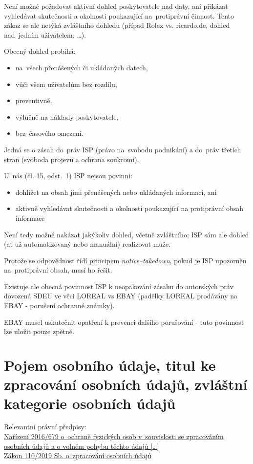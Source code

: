 Není možné požadovat aktivní dohled poskytovatele nad daty, ani přikázat vyhledávat skutečnosti a okolnosti poukazující na~protiprávní činnost.
Tento zákaz se ale netýká zvláštního dohledu (případ Rolex vs. ricardo.de, dohled nad~jedním uživatelem, \dots).

Obecný dohled probíhá:
\begin{itemize}
    \item na~všech přenášených či ukládaných datech,
    \item vůči všem uživatelům bez rozdílu,
    \item preventivně,
    \item výlučně na náklady poskytovatele,
    \item bez~časového omezení.
\end{itemize}
Jedná se o zásah do~práv ISP (právo na~svobodu podnikání) a do~práv třetích stran (svoboda projevu a ochrana soukromí).

U~nás (čl. 15, odst.~1) ISP nejsou povinni:
\begin{itemize}
    \item dohlížet na obsah jimi přenášených nebo ukládaných informaci, ani
    \item aktivně vyhledávat skutečnosti a okolnosti poukazující na protiprávní obsah informace
\end{itemize}

Není tedy možné nakázat jakýkoliv dohled, včetně zvláštního; ISP sám ale dohled (ať už automatizovaný nebo manuální) realizovat může.

Protože se odpovědnost řídí principem \emph{notice--takedown}, pokud je ISP upozorněn na~protiprávní obsah, musí ho řešit.

Existuje ale obecná povinnost ISP k neopakování zásahu do autorských práv dovozená SDEU ve věci LOREAL vs EBAY (padělky LOREAL prodávány na EBAY - porušení ochranné známky).

EBAY musel uskutečnit opatření k prevenci dalšího porušování - tuto povinnost lze uložit pouze zpětně.

\clearpage
\section{Pojem osobního údaje, titul ke zpracování osobních údajů, zvláštní kategorie osobních údajů}

{}Relevantní právní předpisy:
\\\href{https://eur-lex.europa.eu/legal-content/CS/ALL/?uri=CELEX:32016R0679
}{Nařízení 2016/679 o~ochraně fyzických osob v~souvislosti se zpracováním osobních údajů a o volném pohybu těchto údajů [\dots]}
\\\href{https://www.zakonyprolidi.cz/cs/2019-110}{Zákon 110/2019 Sb. o~zpracování osobních údajů}

